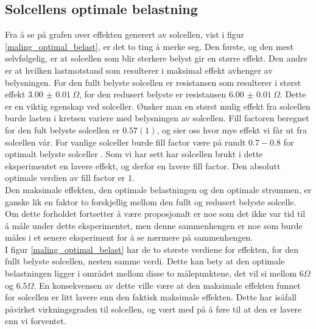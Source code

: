 \documentclass[%
 reprint,
 amsmath,amssymb,
 aps,
 norsk,
 booktabs
]{revtex4-1}
\begin{document}
\subsection{Solcellens optimale belastning}
Fra å se på grafen over effekten generert av solcellen, vist i figur \vref{maling_optimal_belast}, er det to ting å merke seg. Den første, og den mest selvfølgelig, er at solcellen som blir sterkere belyst gir en større effekt. Den andre er at hvilken lastmotstand som resulterer i maksimal effekt avhenger av belysningen. For den fullt belyste solcellen er resistansen som resulterer i størst effekt $\SI{3.00(1)}{\Omega}$, for den redusert belyste er resistansen $\SI{6.00(1)}{\Omega}$. Dette er en viktig egenskap ved solceller. Ønsker man en størst mulig effekt fra solcellen burde lasten i kretsen variere med belysningen av solcellen. Fill factoren beregnet for den fult belyste solcellen er $0.57(1)$, og sier oss hvor mye effekt vi får ut fra solcellen vår. For vanlige solceller burde fill factor være på rundt $0.7-0.8$ for optimalt belyste solceller \cite{energy_alt}. Som vi har sett har solcellen brukt i dette eksperimentet en lavere effekt, og derfor en lavere fill factor. Den absolutt optimale verdien av fill factor er $1$.
\\Den maksimale effekten, den optimale belastningen og den optimale strømmen, er ganske lik en faktor to forskjellig mellom den fullt og redusert belyste solcelle. Om dette forholdet fortsetter å være proposjonalt er noe som det ikke var tid til å måle under dette eksperimentet, men denne sammenhengen er noe som burde måles i et senere eksperiment for å se nærmere på sammenhengen.\\
I figur \vref{maling_optimal_belast} har de to største verdiene for effekten, for den fullt belyste solcellen, nesten samme verdi. Dette kan bety at den optimale belastningen ligger i området mellom disse to målepunktene, det vil si mellom $6\Omega$ og $6.5\Omega$. En konsekvensen av dette ville være at den maksimale effekten funnet for solcellen er litt lavere enn den faktisk maksimale effekten. Dette har isåfall påvirket virkningsgraden til solcellen, og vært med på å føre til at den er lavere enn vi forventet.
\end{document}
